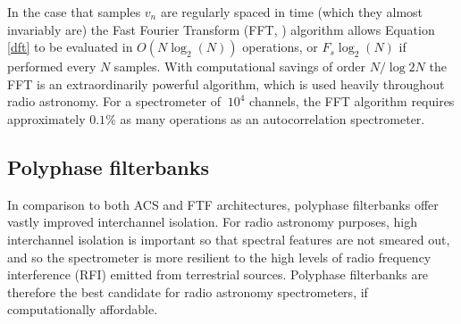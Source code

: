 \documentclass{ws-rv961x669}
\begin{document}
In the case that samples $v_n$ are regularly spaced in time (which they almost invariably are) the Fast Fourier Transform (FFT, \cite{Cooley1965}) algorithm allows Equation \ref{dft} to be evaluated in $O(N\log_2(N))$ operations, or $F_s\log_2(N)$ if performed every $N$ samples. With computational savings of order $N / \log2{N}$ the FFT is an extraordinarily powerful algorithm, which is used heavily throughout radio astronomy. For a spectrometer of $~10^4$ channels, the FFT algorithm requires approximately $0.1\%$ as many operations as an autocorrelation spectrometer.







\subsection{Polyphase filterbanks}

In comparison to both ACS and FTF architectures, polyphase filterbanks offer vastly improved interchannel isolation. For radio astronomy
purposes, high interchannel isolation is important so that spectral features are not smeared out, and so the spectrometer is more resilient to the high levels of radio frequency interference (RFI) emitted from terrestrial sources. Polyphase filterbanks are therefore the best candidate for radio astronomy spectrometers, if computationally affordable.
\end{document}
